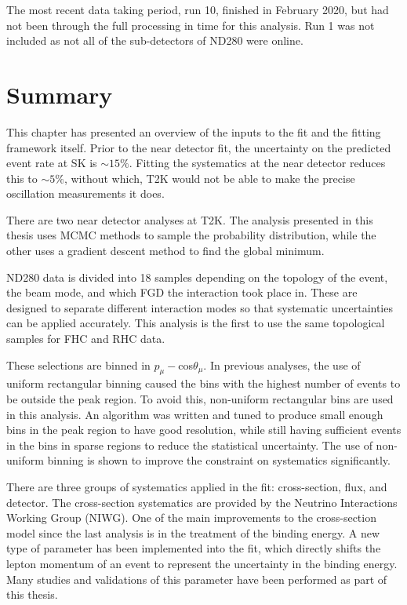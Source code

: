 The most recent data taking period, run 10, finished in February 2020, but had not been through the full processing in time for this analysis. Run 1 was not included as not all of the sub-detectors of ND280 were online.

\section{Summary}

This chapter has presented an overview of the inputs to the fit and the fitting framework itself. Prior to the near detector fit, the uncertainty on the predicted event rate at SK is $\sim15\%$. Fitting the systematics at the near detector reduces this to $\sim5\%$, without which, T2K would not be able to make the precise oscillation measurements it does.

There are two near detector analyses at T2K. The analysis presented in this thesis uses MCMC methods to sample the probability distribution, while the other uses a gradient descent method to find the global minimum.

ND280 data is divided into 18 samples depending on the topology of the event, the beam mode, and which FGD the interaction took place in. These are designed to separate different interaction modes so that systematic uncertainties can be applied accurately. This analysis is the first to use the same topological samples for FHC and RHC data.

These selections are binned in $p_{\mu}-$cos$\theta_{\mu}$. In previous analyses, the use of uniform rectangular binning caused the bins with the highest number of events to be outside the peak region. To avoid this, non-uniform rectangular bins are used in this analysis. An algorithm was written and tuned to produce small enough bins in the peak region to have good resolution, while still having sufficient events in the bins in sparse regions to reduce the statistical uncertainty. The use of non-uniform binning is shown to improve the constraint on systematics significantly. 

There are three groups of systematics applied in the fit: cross-section, flux, and detector. The cross-section systematics are provided by the Neutrino Interactions Working Group (NIWG). One of the main improvements to the cross-section model since the last analysis is in the treatment of the binding energy. A new type of parameter has been implemented into the fit, which directly shifts the lepton momentum of an event to represent the uncertainty in the binding energy. Many studies and validations of this parameter have been performed as part of this thesis. 

